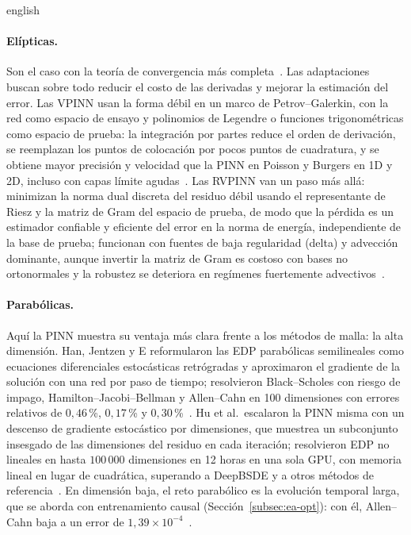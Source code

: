 \documentclass[../0000.tex]{subfiles}
\begin{document}
\begin{hyphenrules}{english}
\paragraph{Elípticas.} Son el caso con la teoría de convergencia más completa~\cite{shin2020convergence,doumeche2025convergence}. Las adaptaciones buscan sobre todo reducir el costo de las derivadas y mejorar la estimación del error. Las VPINN usan la forma débil en un marco de Petrov--Galerkin, con la red como espacio de ensayo y polinomios de Legendre o funciones trigonométricas como espacio de prueba: la integración por partes reduce el orden de derivación, se reemplazan los puntos de colocación por pocos puntos de cuadratura, y se obtiene mayor precisión y velocidad que la PINN en Poisson y Burgers en 1D y 2D, incluso con capas límite agudas~\cite{kharazmi2019}. Las RVPINN van un paso más allá: minimizan la norma dual discreta del residuo débil usando el representante de Riesz y la matriz de Gram del espacio de prueba, de modo que la pérdida es un estimador confiable y eficiente del error en la norma de energía, independiente de la base de prueba; funcionan con fuentes de baja regularidad (delta) y advección dominante, aunque invertir la matriz de Gram es costoso con bases no ortonormales y la robustez se deteriora en regímenes fuertemente advectivos~\cite{rojas2024robust}.

\paragraph{Parabólicas.} Aquí la PINN muestra su ventaja más clara frente a los métodos de malla: la alta dimensión. Han, Jentzen y E reformularon las EDP parabólicas semilineales como ecuaciones diferenciales estocásticas retrógradas y aproximaron el gradiente de la solución con una red por paso de tiempo; resolvieron Black--Scholes con riesgo de impago, Hamilton--Jacobi--Bellman y Allen--Cahn en 100 dimensiones con errores relativos de $0{,}46$\,\%, $0{,}17$\,\% y $0{,}30$\,\%~\cite{han2018solving}. Hu et al.\ escalaron la PINN misma con un descenso de gradiente estocástico por dimensiones, que muestrea un subconjunto insesgado de las dimensiones del residuo en cada iteración; resolvieron EDP no lineales en hasta $100\,000$ dimensiones en 12 horas en una sola GPU, con memoria lineal en lugar de cuadrática, superando a DeepBSDE y a otros métodos de referencia~\cite{hu2024tackling}. En dimensión baja, el reto parabólico es la evolución temporal larga, que se aborda con entrenamiento causal (Sección~\ref{subsec:ea-opt}): con él, Allen--Cahn baja a un error de $1{,}39\times10^{-4}$~\cite{wang2024causality}.


\end{hyphenrules}
\end{document}
